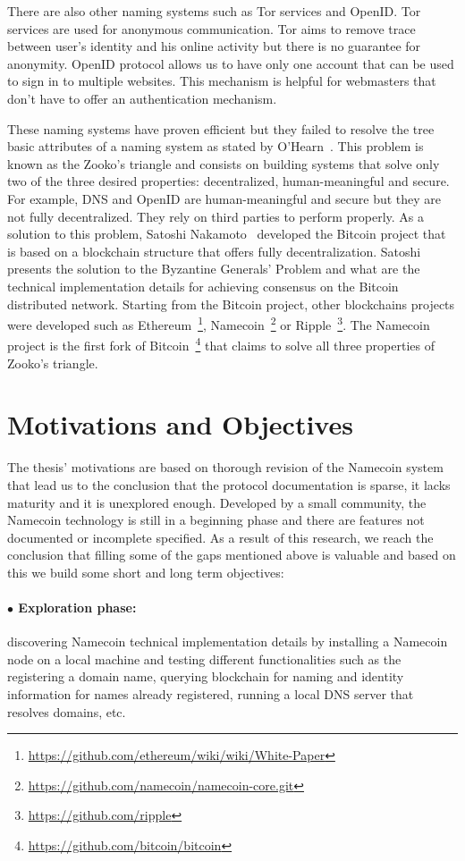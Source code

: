 There are also other naming systems such as Tor services and OpenID. Tor services are used for anonymous communication. Tor aims to remove trace between user's identity and his online activity but there is no guarantee for anonymity. OpenID protocol allows us to have only one account that can be used to sign in to multiple websites. This mechanism is helpful for webmasters that don't have to offer an authentication mechanism.

These naming systems have proven efficient but they failed to resolve the tree basic attributes of a naming system as stated by O’Hearn~\cite{wilcox2001names}.
This problem is known as the Zooko's triangle and consists on building systems that solve only two of the three desired properties: decentralized, human-meaningful and secure. For example, DNS and OpenID are human-meaningful and secure but they are not fully decentralized. They rely on third parties to perform properly.
As a solution to this problem, Satoshi Nakamoto~\cite{bitcoinwhitepaper} developed the Bitcoin project that is based on a blockchain structure that offers fully decentralization. Satoshi presents the solution to the Byzantine Generals’ Problem and what are the technical implementation details for achieving consensus on the Bitcoin distributed network.
Starting from the Bitcoin project, other blockchains projects were developed such as Ethereum~\footnote{\url{https://github.com/ethereum/wiki/wiki/White-Paper}}, Namecoin~\footnote{\url{https://github.com/namecoin/namecoin-core.git}} or Ripple~\footnote{\url{https://github.com/ripple}}.
The Namecoin project is the first fork of Bitcoin~\footnote{\url{https://github.com/bitcoin/bitcoin}} that claims to solve all three properties of Zooko's triangle.

\section{Motivations and Objectives}
\label{sec:motiv-obj-lbl}
The thesis' motivations are based on thorough revision of the Namecoin system that lead us to the conclusion that the protocol documentation is sparse, it lacks maturity and it is unexplored enough. Developed by a small community, the Namecoin technology is still in a beginning phase and there are features not documented or incomplete specified.
As a result of this research, we reach the conclusion that filling some of the gaps mentioned above is valuable and based on this we build some short and long term objectives:

\paragraph{$\bullet$ Exploration phase:} discovering Namecoin technical implementation details by installing a Namecoin node on a local machine and testing different functionalities such as the registering a domain name, querying blockchain for naming and identity information for names already registered, running a local DNS server that resolves  domains, etc.
